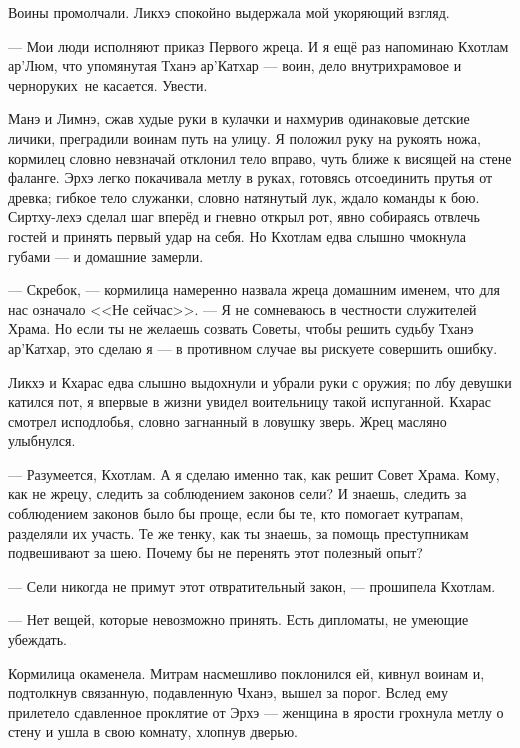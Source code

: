 Воины промолчали.
Ликхэ спокойно выдержала мой укоряющий взгляд.

--- Мои люди исполняют приказ Первого жреца.
И я ещё раз напоминаю Кхотлам ар’Люм, что упомянутая Тханэ ар’Катхар --- воин, дело внутрихрамовое и черноруких\FM\ не касается.
Увести.

Манэ и Лимнэ, сжав худые руки в кулачки и нахмурив одинаковые детские личики, преградили воинам путь на улицу.
Я положил руку на рукоять ножа, кормилец словно невзначай отклонил тело вправо, чуть ближе к висящей на стене фаланге.
Эрхэ легко покачивала метлу в руках, готовясь отсоединить прутья от древка;
гибкое тело служанки, словно натянутый лук, ждало команды к бою.
Сиртху-лехэ сделал шаг вперёд и гневно открыл рот, явно собираясь отвлечь гостей и принять первый удар на себя.
Но Кхотлам едва слышно чмокнула губами --- и домашние замерли.

--- Скребок, --- кормилица намеренно назвала жреца домашним именем, что для нас означало <<Не сейчас>>.
--- Я не сомневаюсь в честности служителей Храма.
Но если ты не желаешь созвать Советы, чтобы решить судьбу Тханэ ар’Катхар, это сделаю я --- в противном случае вы рискуете совершить ошибку.

Ликхэ и Кхарас едва слышно выдохнули и убрали руки с оружия;
по лбу девушки катился пот, я впервые в жизни увидел воительницу такой испуганной.
Кхарас смотрел исподлобья, словно загнанный в ловушку зверь.
Жрец масляно улыбнулся.

--- Разумеется, Кхотлам.
А я сделаю именно так, как решит Совет Храма.
Кому, как не жрецу, следить за соблюдением законов сели?
И знаешь, следить за соблюдением законов было бы проще, если бы те, кто помогает кутрапам, разделяли их участь.
Те же тенку, как ты знаешь, за помощь преступникам подвешивают за шею.
Почему бы не перенять этот полезный опыт?

--- Сели никогда не примут этот отвратительный закон, --- прошипела Кхотлам.

--- Нет вещей, которые невозможно принять.
Есть дипломаты, не умеющие убеждать.

Кормилица окаменела.
Митрам насмешливо поклонился ей, кивнул воинам и, подтолкнув связанную, подавленную Чханэ, вышел за порог.
Вслед ему прилетело сдавленное проклятие от Эрхэ --- женщина в ярости грохнула метлу о стену и ушла в свою комнату, хлопнув дверью.

